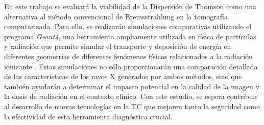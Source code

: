 En este trabajo se evaluará la viabilidad de la Dispersión de Thomson como una alternativa al método convencional de Bremsstrahlung en la tomografía computarizada. Para ello, se realizarán simulaciones comparativas utilizando el programa \textit{Geant4}, una herramienta ampliamente utilizada en física de partículas y radiación que permite simular el transporte y deposición de energía en diferentes geometrías de diferentes fenómenos físicos relacionados a la radiación ionizante \cite{agostinelli2003geant4}. Estas simulaciones no sólo proporcionarán una comparación detallada de las características de los rayos X generados por ambos métodos, sino que también ayudarán a determinar el impacto potencial en la calidad de la imagen y la dosis de radiación en el contexto clínico. Con este estudio, se espera contribuir al desarrollo de nuevas tecnologías en la TC que mejoren tanto la seguridad como la efectividad de esta herramienta diagnóstica crucial.


\vspace*{\fill}